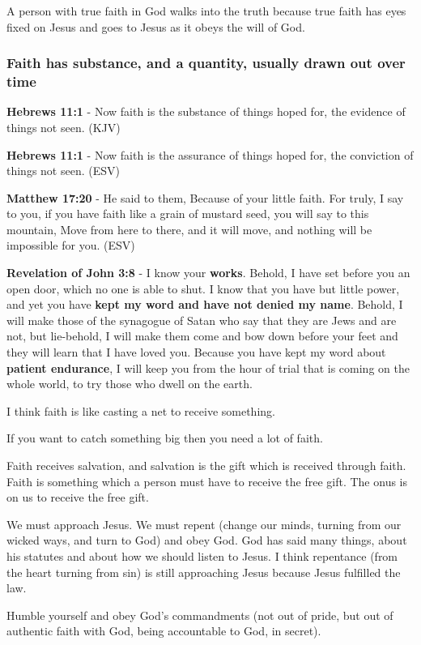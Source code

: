 \documentclass[11pt]{article}
\begin{document}
A person with true faith in God walks into the truth because true faith has eyes fixed on Jesus and goes to Jesus as it obeys the will of God.

\subsubsection{Faith has substance, and a quantity, usually drawn out over time}
\label{sec:org3b28905}
\textbf{Hebrews 11:1} - Now faith is the substance of things hoped for, the evidence of things not seen. (KJV)

\textbf{Hebrews 11:1} - Now faith is the assurance of things hoped for, the conviction of things not seen. (ESV)

\textbf{Matthew 17:20} - He said to them, Because of your little faith. For truly, I say to you, if you have faith like a grain of mustard seed, you will say to this mountain, Move from here to there, and it will move, and nothing will be impossible for you. (ESV)

\textbf{Revelation of John 3:8} - I know your \textbf{works}. Behold, I have set before you an open door, which no one is able to shut. I know that you have but little power, and yet you have \textbf{kept my word and have not denied my name}. Behold, I will make those of the synagogue of Satan who say that they are Jews and are not, but lie-behold, I will make them come and bow down before your feet and they will learn that I have loved you. Because you have kept my word about \textbf{patient endurance}, I will keep you from the hour of trial that is coming on the whole world, to try those who dwell on the earth.

I think faith is like casting a net to receive something.

If you want to catch something big then you need a lot of faith.

Faith receives salvation, and salvation is the gift which is received through faith.
Faith is something which a person must have to receive the free gift.
The onus is on us to receive the free gift.

We must approach Jesus.
We must repent (change our minds, turning from our wicked ways, and turn to God) and obey God.
God has said many things, about his statutes and about how we should listen to Jesus.
I think repentance (from the heart turning from sin) is still approaching Jesus because Jesus fulfilled the law.

Humble yourself and obey God's commandments (not out of pride, but out of authentic faith with God, being accountable to God, in secret).
\end{document}
